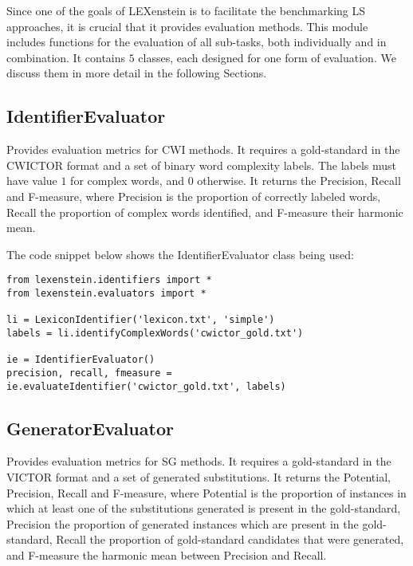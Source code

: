 Since one of the goals of LEXenstein is to facilitate the benchmarking LS approaches, it is crucial that it provides evaluation methods. This module includes functions for the evaluation of all sub-tasks, both individually and in combination. It contains $5$ classes, each designed for one form of evaluation. We discuss them in more detail in the following Sections.









\subsection{IdentifierEvaluator}

Provides evaluation metrics for CWI methods. It requires a gold-standard in the CWICTOR format and a set of binary word complexity labels. The labels must have value $1$ for complex words, and $0$ otherwise. It returns the Precision, Recall and F-measure, where Precision is the proportion of correctly labeled words, Recall the proportion of complex words identified, and F-measure their harmonic mean.

The code snippet below shows the IdentifierEvaluator class being used:

\begin{lstlisting}
from lexenstein.identifiers import *
from lexenstein.evaluators import *

li = LexiconIdentifier('lexicon.txt', 'simple')
labels = li.identifyComplexWords('cwictor_gold.txt')

ie = IdentifierEvaluator()
precision, recall, fmeasure = ie.evaluateIdentifier('cwictor_gold.txt', labels)
\end{lstlisting}













\subsection{GeneratorEvaluator}

Provides evaluation metrics for SG methods. It requires a gold-standard in the VICTOR format and a set of generated substitutions. It returns the Potential, Precision, Recall and F-measure, where Potential is the proportion of instances in which at least one of the substitutions generated is present in the gold-standard, Precision the proportion of generated instances which are present in the gold-standard, Recall the proportion of gold-standard candidates that were generated, and F-measure the harmonic mean between Precision and Recall.

